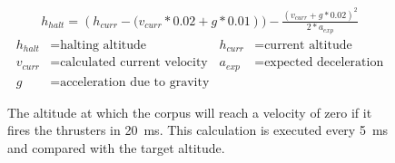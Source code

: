 \begin{figure}[H]
\begin{align*}
h_{halt}=({h_{curr}-({v_{curr}*0.02}+{g*0.01}}))-{\frac{({v_{curr}+g*0.02})^{2}}{2*a_{exp}}}
\end{align*}
\begin{align*}
h_{halt} &= \text{halting altitude} & h_{curr} &= \text{current altitude} \\
v_{curr} &= \text{calculated current velocity} & a_{exp} &= \text{expected deceleration} \\
g &= \text{acceleration due to gravity}
\end{align*}
\caption{The altitude at which the corpus will reach a velocity of zero if it fires the thrusters in \SI{20}{\milli\second}. This calculation is executed every \SI{5}{\milli\second} and compared with the target altitude.}
\end{figure}
